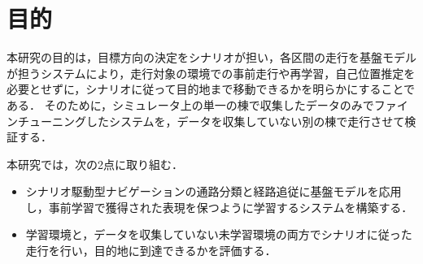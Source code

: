 \section{目的}
\label{sec:purpose}

本研究の目的は，目標方向の決定をシナリオが担い，各区間の走行を基盤モデルが担うシステムにより，走行対象の環境での事前走行や再学習，自己位置推定を必要とせずに，シナリオに従って目的地まで移動できるかを明らかにすることである．
そのために，シミュレータ上の単一の棟で収集したデータのみでファインチューニングしたシステムを，データを収集していない別の棟で走行させて検証する．

本研究では，次の2点に取り組む．
\begin{itemize}
  \item シナリオ駆動型ナビゲーションの通路分類と経路追従に基盤モデルを応用し，事前学習で獲得された表現を保つように学習するシステムを構築する．
  \item 学習環境と，データを収集していない未学習環境の両方でシナリオに従った走行を行い，目的地に到達できるかを評価する．
\end{itemize}

